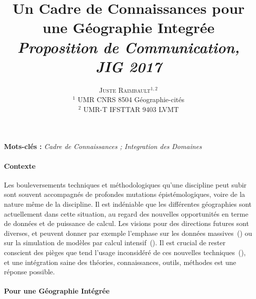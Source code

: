 \documentclass[11pt]{article}
\newcommand{\noun}[1]{\textsc{#1}}
\begin{document}
\title{%
Un Cadre de Connaissances pour une Géographie Integrée
\bigskip\bigskip\\
\textit{Proposition de Communication, JIG 2017}
}
\author{\noun{Juste Raimbault}$^{1,2}$\medskip\\%
$^1$ UMR CNRS 8504 Géographie-cités\\
$^2$ UMR-T IFSTTAR 9403 LVMT\\
}
\date{}

\maketitle

\justify



\textbf{Mots-clés : }\textit{Cadre de Connaissances ; Integration des Domaines}

\medskip


\paragraph{Contexte}

Les bouleversements techniques et méthodologiques qu'une discipline peut subir sont souvent accompagnés de profondes mutations épistémologiques, voire de la nature même de la discipline. Il est indéniable que les différentes géographies sont actuellement dans cette situation, au regard des nouvelles opportunités en terme de données et de puissance de calcul. Les visions pour des directions futures sont diverses, et peuvent donner par exemple l'emphase sur les données massives~(\cite{batty2012smart}) ou sur la simulation de modèles par calcul intensif~(\cite{pumain2017urban}). Il est crucial de rester conscient des pièges que tend l'usage inconsidéré de ces nouvelles techniques~(\cite{raimbault2016cautious}), et une intégration saine des théories, connaissances, outils, méthodes est une réponse possible. 


\paragraph{Pour une Géographie Intégrée}
\end{document}
